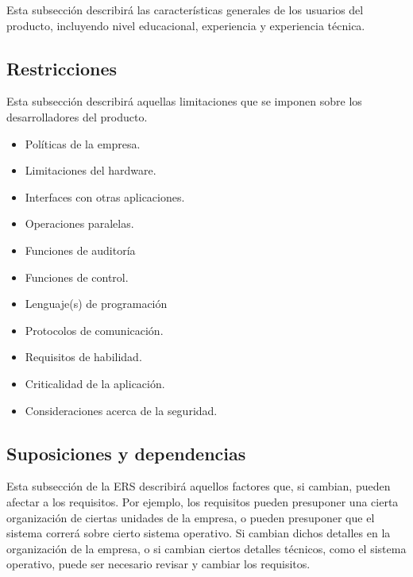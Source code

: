 \documentclass[12pt,a4paper, twosite]{article}
\begin{document}
Esta subsección describirá las características generales de los
usuarios del producto, incluyendo nivel educacional, experiencia y
experiencia técnica.


\subsection{Restricciones}
\label{sec:org5ca5790}

Esta subsección describirá aquellas limitaciones que se imponen
sobre los desarrolladores del producto.

\begin{itemize}
\item Políticas de la empresa.

\item Limitaciones del hardware.

\item Interfaces con otras aplicaciones.

\item Operaciones paralelas.

\item Funciones de auditoría

\item Funciones de control.

\item Lenguaje(s) de programación

\item Protocolos de comunicación.

\item Requisitos de habilidad.

\item Criticalidad de la aplicación.

\item Consideraciones acerca de la seguridad.
\end{itemize}


\subsection{Suposiciones y dependencias}
\label{sec:org0ae23fe}

Esta subsección de la ERS describirá aquellos factores que, si
cambian, pueden afectar a los requisitos. Por ejemplo, los
requisitos pueden presuponer una cierta organización de ciertas
unidades de la empresa, o pueden presuponer que  el sistema correrá
sobre cierto sistema operativo. Si cambian dichos detalles en la
organización de la empresa, o si cambian ciertos detalles técnicos,
como el sistema operativo, puede ser necesario revisar y cambiar los
requisitos. 
\end{document}
